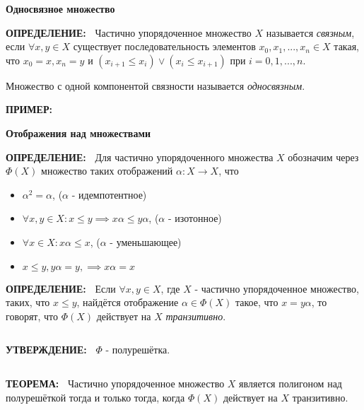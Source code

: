 \documentclass{beamer}
\newcommand{\green}{\color[rgb]{0,0.4,0}}
\newcommand{\blue}{\color{blue}}
\newcommand{\statement}{%
	 {\bf \green УТВЕРЖДЕНИЕ:\ }}
\newcommand{\theor}{%
     {\bf \green ТЕОРЕМА:\ }}
\newcommand{\definit}{%
     {\bf \green ОПРЕДЕЛЕНИЕ:\ }}
\newcommand{\examp}{%
     {\bf \green ПРИМЕР:\ }}
\newcommand{\retline}{

$ $

}
\begin{document}
\begin{frame}
{\bf {\blue} Односвязное множество}

{\definit}
Частично упорядоченное множество $X$ называется \textit{связным},
если $\forall x,y \in X$ существует последовательность элементов
$x_0,x_1, ... ,x_n \in X$ такая, что $x_0 = x, x_n = y$ и
$(x_{i+1} \leq x_i) \lor (x_i \leq x_{i+1})$ при 
$i = 0,1, ... , n$.

Множество с одной компонентой связности называется \textit{односвязным}.

{\examp}

\begin{center}
\end{center}
\end{frame}

\begin{frame}
{\bf {\blue} Отображения над множествами}

{\definit}
Для частично упорядоченного множества $X$ обозначим через $\Phi(X)$ множество таких отображений $\alpha : X \rightarrow X$, что
\begin{itemize}
\item 
$\alpha^2 = \alpha$, ($\alpha$ - идемпотентное)
\item 
$\forall x,y \in X: x \leq y \implies x\alpha \leq y\alpha$, ($\alpha$ - изотонное)
\item 
$\forall x \in X: x\alpha \leq x$, ($\alpha$ - уменьшающее)
\item 
$x \leq y, y\alpha = y, \implies x\alpha = x$
\end{itemize}
\end{frame}

\begin{frame}

{\definit}
Если $\forall x, y \in X$, где $X$ - частично упорядоченное множество, таких, что $x \leq y$, найдётся отображение $\alpha \in \Phi(X)$ такое, что $x = y\alpha$, то говорят, что $\Phi(X)$ действует на $X$ \textit{транзитивно}.
{\retline}

{\statement}
$\Phi$ - полурешётка.
{\retline}

{\theor}
Частично упорядоченное множество $X$ является полигоном над полурешёткой тогда и только тогда, когда $\Phi(X)$ действует на $X$ транзитивно.
\end{frame}
\end{document}
